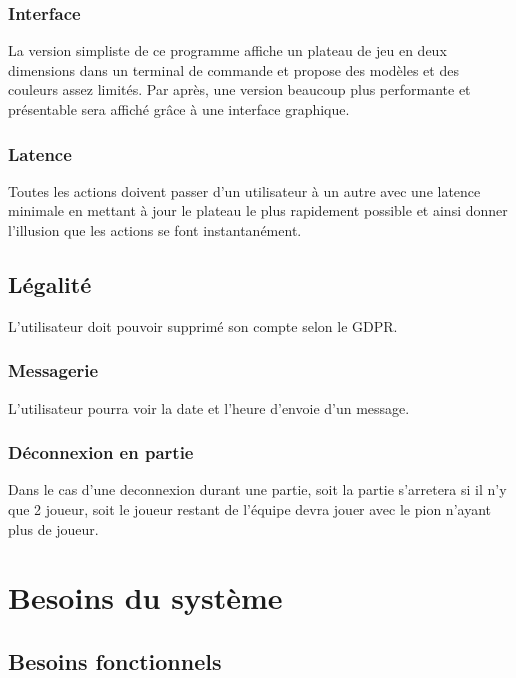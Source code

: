 \documentclass[french, utf8]{article}
\begin{document}
\subsubsection{Interface}
La version simpliste de ce programme affiche un plateau de jeu en deux dimensions dans un terminal de commande et propose des modèles et des couleurs assez limités. \newline
Par après, une version beaucoup plus performante et présentable sera affiché grâce à une interface graphique.
\subsubsection{Latence}
Toutes les actions doivent passer d’un utilisateur à un autre avec une latence minimale en mettant à jour le plateau le plus rapidement possible et ainsi donner l'illusion que les actions se font instantanément.
\subsection{Légalité}
L'utilisateur doit pouvoir supprimé son compte selon le GDPR.
\subsubsection{Messagerie}
L'utilisateur pourra voir la date et l'heure d'envoie d'un message.
\subsubsection{Déconnexion en partie}
Dans le cas d'une deconnexion durant une partie, soit la partie s'arretera si il n'y que 2 joueur, soit le joueur restant de l'équipe devra jouer avec le pion n'ayant plus de joueur.

\section{Besoins du système}

\subsection{Besoins fonctionnels}
\\
\\
\\
\\
\\
\\
\\
\\
\\
\\
\\
\end{document}
